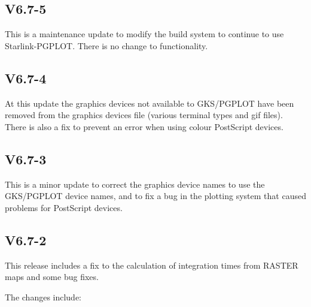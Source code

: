 \documentclass[twoside,11pt,nolof]{starlink}
\begin{document}
\subsection{V6.7-5}

This is a maintenance update to modify the build system to continue to use
Starlink-PGPLOT.  There is no change to functionality.

\subsection{V6.7-4}

At this update the graphics devices not available to GKS/PGPLOT have been
removed from the graphics devices file (various terminal types and gif files).
There is also a fix to prevent an error when using colour PostScript devices.

\subsection{V6.7-3}

This is a minor update to correct the graphics device names to use the
GKS/PGPLOT device names, and to fix a bug in the plotting system that caused
problems for PostScript devices.

\subsection{V6.7-2}

This release includes a fix to the calculation of integration times from
RASTER maps and some bug fixes.

The changes include:
\end{document}
